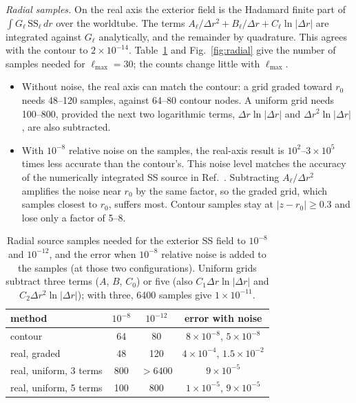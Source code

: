 \documentclass[aps,prl,twocolumn,superscriptaddress,nofootinbib,floatfix]{revtex4-2}
\begin{document}
\emph{Radial samples.}
On the real axis the exterior field is the Hadamard finite part of $\int G_\ell\,\mathrm{SS}_\ell\,dr$ over the worldtube.
The terms $A_\ell/\Delta r^2+B_\ell/\Delta r+C_\ell\ln|\Delta r|$ are integrated against $G_\ell$ analytically, and the remainder by quadrature.
This agrees with the contour to $2\times10^{-14}$.
Table~\ref{tab:radial} and Fig.~\ref{fig:radial} give the number of samples needed for $\ell_{\max}=30$; the counts change little with $\ell_{\max}$.
\begin{itemize}
\item Without noise, the real axis can match the contour: a grid graded toward $r_0$ needs 48--120 samples, against 64--80 contour nodes.
A uniform grid needs 100--800, provided the next two logarithmic terms, $\Delta r\ln|\Delta r|$ and $\Delta r^2\ln|\Delta r|$, are also subtracted.
\item With $10^{-8}$ relative noise on the samples, the real-axis result is $10^2$--$3\times10^5$ times less accurate than the contour's.
This noise level matches the accuracy of the numerically integrated SS source in Ref.~\cite{Upton2026}.
Subtracting $A_\ell/\Delta r^2$ amplifies the noise near $r_0$ by the same factor, so the graded grid, which samples closest to $r_0$, suffers most.
Contour samples stay at $|z-r_0|\ge0.3$ and lose only a factor of 5--8.
\end{itemize}

\begin{table}[t]
\caption{Radial source samples needed for the exterior SS field to $10^{-8}$ and $10^{-12}$, and the error when $10^{-8}$ relative noise is added to the samples (at those two configurations).
Uniform grids subtract three terms ($A$, $B$, $C_0$) or five (also $C_1\Delta r\ln|\Delta r|$ and $C_2\Delta r^2\ln|\Delta r|$); with three, 6400 samples give $1\times10^{-11}$.}
\label{tab:radial}
\begin{ruledtabular}
\begin{tabular}{lccc}
method & $10^{-8}$ & $10^{-12}$ & error with noise\\
\hline
contour & 64 & 80 & $8\times10^{-8}$, $5\times10^{-8}$\\
real, graded & 48 & 120 & $4\times10^{-4}$, $1.5\times10^{-2}$\\
real, uniform, 3 terms & 800 & $>6400$ & $9\times10^{-5}$\\
real, uniform, 5 terms & 100 & 800 & $1\times10^{-5}$, $9\times10^{-5}$\\
\end{tabular}
\end{ruledtabular}
\end{table}
\end{document}
